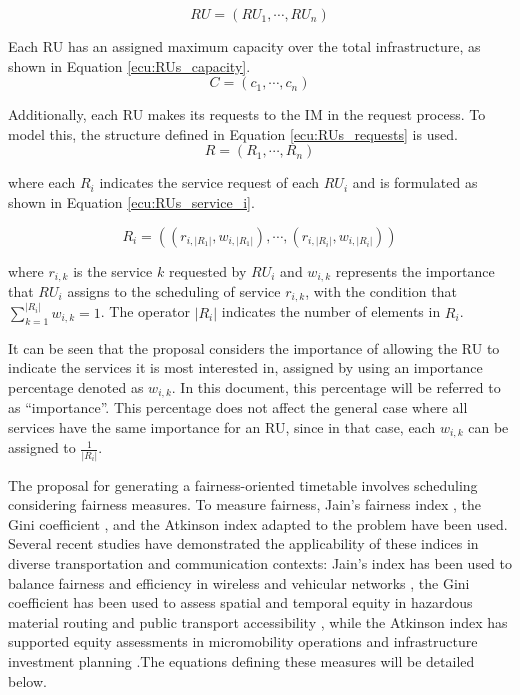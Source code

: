 \documentclass[preprint,12pt]{elsarticle}
\begin{document}
\begin{equation}\label{ecu:RUs_definition}
    RU = (RU_1, \cdots, RU_n)
\end{equation}

Each RU has an assigned maximum capacity over the total infrastructure, as shown in Equation \ref{ecu:RUs_capacity}. 
    \begin{equation}\label{ecu:RUs_capacity}
        C = (c_1, \cdots, c_n )
    \end{equation}

Additionally, each \gls{RU} makes its requests to the \gls{IM} in the request process. To model this, the structure defined in Equation \ref{ecu:RUs_requests} is used.
\begin{equation}\label{ecu:RUs_requests}
    R = (R_1, \cdots, R_n)
\end{equation}

where each $R_i$ indicates the service request of each $RU_i$ and is formulated as shown in Equation \ref{ecu:RUs_service_i}.


\begin{equation}\label{ecu:RUs_service_i}
    R_i = ( (r_{i,|R_1|},w_{i,|R_1|}), \cdots, (r_{i,|R_i|},w_{i,|R_i|}) )
\end{equation}

where $r_{i,k}$ is the service $k$ requested by $RU_i$ and $w_{i,k}$ represents the importance that $RU_i$ assigns to the scheduling of service $r_{i,k}$, with the condition that $\sum^{|R_i|}_{k=1} w_{i,k} = 1$. The operator $|R_i|$ indicates the number of elements in $R_i$.

It can be seen that the proposal considers the importance of allowing the RU to indicate the services it is most interested in, assigned by using an importance percentage denoted as $w_{i,k}$. In this document, this percentage will be referred to as ``importance''. This percentage does not affect the general case where all services have the same importance for an RU, since in that case, each $w_{i,k}$ can be assigned to $\frac{1}{|R_i|}$.

The proposal for generating a fairness-oriented timetable involves scheduling considering fairness measures. To measure fairness, Jain's fairness index \cite{Jain1998}, the Gini coefficient \cite{Gini1912}, and the Atkinson index \cite{Atkinson1970} adapted to the problem have been used. Several recent studies have demonstrated the applicability of these indices in diverse transportation and communication contexts: Jain's index has been used to balance fairness and efficiency in wireless and vehicular networks \cite{Elnaby2021, Avcil2024}, the Gini coefficient has been used to assess spatial and temporal equity in hazardous material routing and public transport accessibility \cite{Romero2016, Raza2023}, while the Atkinson index has supported equity assessments in micromobility operations and infrastructure investment planning \cite{Lina2024, Chen2025}.The equations defining these measures will be detailed below.
\end{document}
